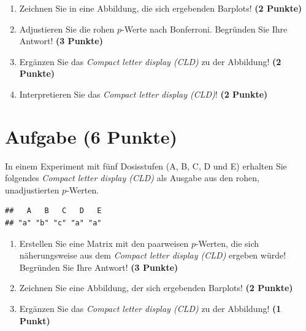 \documentclass[a4paper, 10pt]{scrartcl}\usepackage[]{graphicx}\usepackage[]{xcolor}
\makeatletter
\newenvironment{kframe}{%
 \def\at@end@of@kframe{}%
 \ifinner\ifhmode%
  \def\at@end@of@kframe{\end{minipage}}%
  \begin{minipage}{\columnwidth}%
 \fi\fi%
 \def\FrameCommand##1{\hskip\@totalleftmargin \hskip-\fboxsep
 \colorbox{shadecolor}{##1}\hskip-\fboxsep
     \hskip-\linewidth \hskip-\@totalleftmargin \hskip\columnwidth}%
 \MakeFramed {\advance\hsize-\width
   \@totalleftmargin\z@ \linewidth\hsize
   \@setminipage}}%
 {\par\unskip\endMakeFramed%
 \at@end@of@kframe}
\newenvironment{knitrout}{}{} %
\makeatother
\begin{document}
\begin{enumerate}
\item Zeichnen Sie in eine Abbildung, die sich ergebenden Barplots! \textbf{(2 Punkte)}
\item Adjustieren Sie die rohen $p$-Werte nach Bonferroni. Begr{\"u}nden Sie Ihre Antwort! \textbf{(3 Punkte)}
\item Erg{\"a}nzen Sie das \textit{Compact letter display (CLD)} zu der
  Abbildung! \textbf{(2 Punkte)}
\item Interpretieren Sie das \textit{Compact letter display (CLD)}! \textbf{(2 Punkte)} 
\end{enumerate}

 
\clearpage

\section{Aufgabe \hfill (6 Punkte)}

In einem Experiment mit f{\"u}nf Dosisstufen (A, B, C, D und E) erhalten Sie
folgendes \textit{Compact letter display (CLD)} als \Rlogo Ausgabe aus den rohen, unadjustierten $p$-Werten. 



\begin{knitrout}
\color{fgcolor}\begin{kframe}
\begin{verbatim}
##   A   B   C   D   E 
## "a" "b" "c" "a" "a"
\end{verbatim}
\end{kframe}
\end{knitrout}

\begin{enumerate}
\item Erstellen Sie eine Matrix mit den paarweisen $p$-Werten, die sich
  n{\"a}herungsweise aus dem \textit{Compact letter display (CLD)} ergeben w{\"u}rde! Begr{\"u}nden Sie Ihre Antwort! \textbf{(3 Punkte)}
\item Zeichnen Sie eine Abbildung, der sich ergebenden Barplots! \textbf{(2 Punkte)}
\item Erg{\"a}nzen Sie das \textit{Compact letter display (CLD)} zu der
  Abbildung! \textbf{(1 Punkt)}
\end{enumerate}

 
\clearpage
\end{document}
